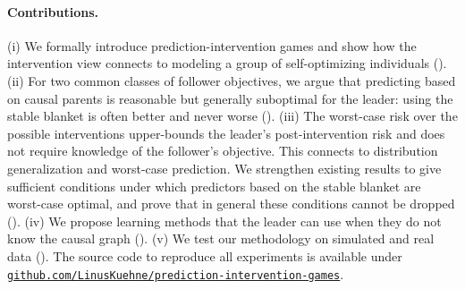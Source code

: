 \paragraph{Contributions.}
(i) We formally introduce prediction-intervention games and show how the
intervention view connects to modeling a group of self-optimizing individuals
().
(ii) For two common classes of follower objectives, we argue that predicting based on causal parents is reasonable
but generally suboptimal for the leader: using the
stable blanket is often better and never worse ().
(iii) The worst-case risk over the possible interventions upper-bounds the leader's post-intervention risk and does not require knowledge of the follower's objective. This connects to
distribution generalization and worst-case prediction. We strengthen existing
results to give sufficient conditions under which predictors based on the stable blanket 
are worst-case optimal, and 
prove
that in general these conditions cannot  be dropped ().
(iv) We propose 
learning methods that the leader can use when they do
not know the causal graph ().
(v) We test our methodology on simulated and real data (). 
The source code to reproduce all experiments is available under \href{https://github.com/LinusKuehne/prediction-intervention-games}{\texttt{github.com/LinusKuehne/prediction-intervention-games}}.









